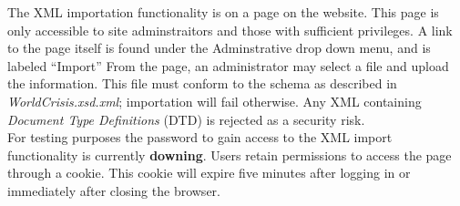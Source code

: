 \documentclass[12pt]{report}
\begin{document}
The XML importation functionality is on a page on the website.
This page is only accessible to site adminstraitors and those with sufficient privileges.
A link to the page itself is found under the Adminstrative drop down menu, and is labeled ``Import''
From the page, an administrator may select a file and upload the information.
This file must conform to the schema as described in \emph{WorldCrisis.xsd.xml}; importation will fail otherwise.
Any XML containing \emph{Document Type Definitions} (DTD) is rejected as a security risk.\\

For testing purposes the password to gain access to the XML import functionality is currently \textbf{downing}.
Users retain permissions to access the page through a cookie.
This cookie will expire five minutes after logging in or immediately after closing the browser.\\
\end{document}
